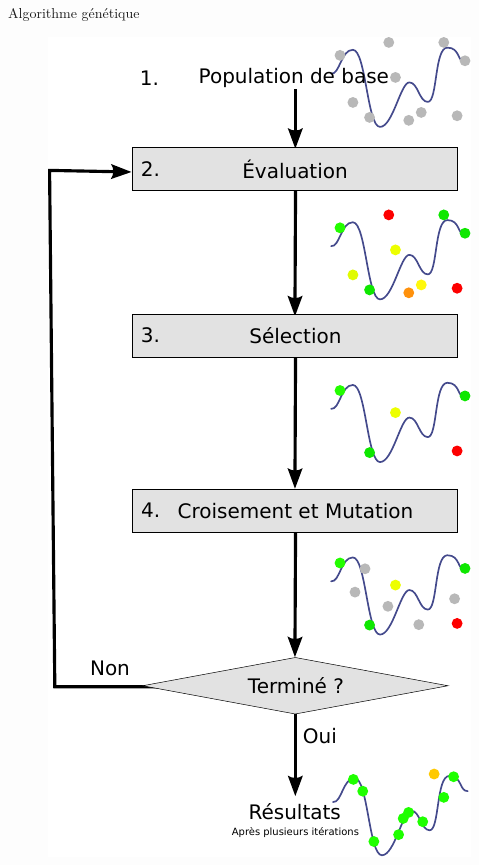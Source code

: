 \begin{frame}{Algorithme génétique}
  \begin{figure}
    \centering
    \includegraphics[scale=.5]{../img/algo_genetique.pdf}
  \end{figure}
\end{frame}


